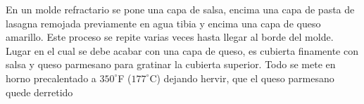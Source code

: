 En un molde refractario se pone una capa de salsa, encima una capa de pasta de lasagna remojada previamente en agua tibia y encima una capa de queso amarillo. Este proceso se repite varias veces hasta llegar al borde del molde. Lugar en el cual se debe acabar con una capa de queso,  es cubierta finamente con salsa y queso parmesano para gratinar la cubierta superior. Todo se mete en horno precalentado a $350^\circ$F ($177^\circ$C) dejando hervir, que el queso parmesano quede derretido\\





